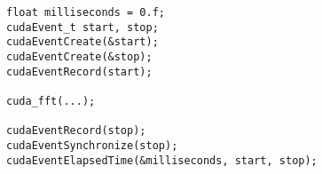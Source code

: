 \lstset{language=C++}
\begin{lstlisting}
float milliseconds = 0.f;
cudaEvent_t start, stop;
cudaEventCreate(&start);
cudaEventCreate(&stop);
cudaEventRecord(start);

cuda_fft(...);

cudaEventRecord(stop);
cudaEventSynchronize(stop);
cudaEventElapsedTime(&milliseconds, start, stop);
\end{lstlisting}